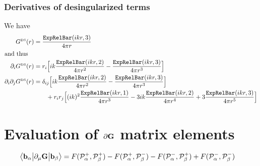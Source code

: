 \documentclass[letterpaper]{article}
\begin{document}
\subsubsection{Derivatives of desingularized terms}

We have
\begin{align*}
 G^{\hbox{\tiny{DS}}}(r) &= \frac{\texttt{ExpRelBar}(ikr,3)}{4\pi r}
\\
\intertext{and thus}
\partial_i 
 G^{\hbox{\tiny{DS}}}(r) &= 
       r_i  \Big[ ik\frac{\texttt{ExpRelBar}(ikr,2)}{4\pi r^2}
                   -\frac{\texttt{ExpRelBar}(ikr,3)}{4\pi r^3}
            \Big]
\\
\partial_i \partial_j
 G^{\hbox{\tiny{DS}}}(r) &= 
  \delta_{ij} \Big[ ik \frac{\texttt{ExpRelBar}(ikr,2)}{4\pi r^2}
                   -\frac{\texttt{ExpRelBar}(ikr,3)}{4\pi r^3}
              \Big]
\\
&\qquad 
 +r_i r_j   \Big[ (ik)^2 \frac{\texttt{ExpRelBar}(ikr,1)}{4\pi r^3}
                  -3ik\frac{\texttt{ExpRelBar}(ikr,2)}{4\pi r^4}
                  +3\frac{\texttt{ExpRelBar}(ikr,3)}{4\pi r^5}
            \Big]
\end{align*}

\newpage
\section{Evaluation of $\partial \mathbf{G}$ matrix elements}

\begin{align*}
 \big\langle \mathbf{b}_\alpha \big| \partial_\mu \mathbf{G} \big| \mathbf{b}_\beta \big\rangle
&=  F(\mathcal{P}_\alpha^+, \mathcal{P}_\beta^+)
   -F(\mathcal{P}_\alpha^+, \mathcal{P}_\beta^-)
   -F(\mathcal{P}_\alpha^-, \mathcal{P}_\beta^+)
   +F(\mathcal{P}_\alpha^-, \mathcal{P}_\beta^-)
\end{align*}
\end{document}
